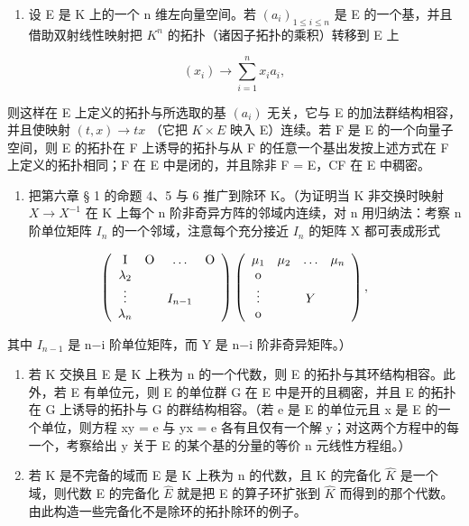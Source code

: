 \begin{enumerate}
\def\labelenumi{\alph{enumi})}
\tightlist
\item
  设 E 是 K 上的一个 n 维左向量空间。若 \((a_{i})_{1\leqslant i\leqslant n}\) 是 E 的一个基，并且借助双射线性映射把 \(K^{n}\) 的拓扑（诸因子拓扑的乘积）转移到 E 上
\end{enumerate}

\[
(x _ {i}) \rightarrow \sum_ {i = 1} ^ {n} x _ {i} a _ {i},
\]

则这样在 E 上定义的拓扑与所选取的基 \((a_{i})\) 无关，它与 E 的加法群结构相容，并且使映射 \((t, x) \to tx\) （它把 \(K \times E\) 映入 E）连续。若 F 是 E 的一个向量子空间，则 E 的拓扑在 F 上诱导的拓扑与从 F 的任意一个基出发按上述方式在 F 上定义的拓扑相同；F 在 E 中是闭的，并且除非 F = E，CF 在 E 中稠密。

\begin{enumerate}
\def\labelenumi{\alph{enumi})}
\setcounter{enumi}{1}
\tightlist
\item
  把第六章 § 1 的命题 4、5 与 6 推广到除环 K。（为证明当 K 非交换时映射 \(X \to X^{-1}\) 在 K 上每个 n 阶非奇异方阵的邻域内连续，对 n 用归纳法：考察 n 阶单位矩阵 \(I_{n}\) 的一个邻域，注意每个充分接近 \(I_{n}\) 的矩阵 X 都可表成形式
\end{enumerate}

\[
\left( \begin{array}{c c c c} \mathrm{I} & \mathrm{O} & \ldots & \mathrm{O} \\ \lambda_ {2} & & & \\ \vdots & & I _ {n - 1} & \\ \lambda_ {n} & & & \end{array} \right) \left( \begin{array}{c c c c} \mu_ {1} & \mu_ {2} & \ldots & \mu_ {n} \\ \mathrm{o} & & & \\ \vdots & & Y & \\ \mathrm{o} & & & \end{array} \right),
\]

其中 \(I_{n-1}\) 是 n−i 阶单位矩阵，而 Y 是 n−i 阶非奇异矩阵。）

\begin{enumerate}
\def\labelenumi{\alph{enumi})}
\setcounter{enumi}{2}
\item
  若 K 交换且 E 是 K 上秩为 n 的一个代数，则 E 的拓扑与其环结构相容。此外，若 E 有单位元，则 E 的单位群 G 在 E 中是开的且稠密，并且 E 的拓扑在 G 上诱导的拓扑与 G 的群结构相容。（若 e 是 E 的单位元且 x 是 E 的一个单位，则方程 xy = e 与 yx = e 各有且仅有一个解 y；对这两个方程中的每一个，考察给出 y 关于 E 的某个基的分量的等价 n 元线性方程组。）
\item
  若 K 是不完备的域而 E 是 K 上秩为 n 的代数，且 K 的完备化 \(\hat{K}\) 是一个域，则代数 E 的完备化 \(\hat{E}\) 就是把 E 的算子环扩张到 \(\hat{K}\) 而得到的那个代数。由此构造一些完备化不是除环的拓扑除环的例子。
\end{enumerate}

